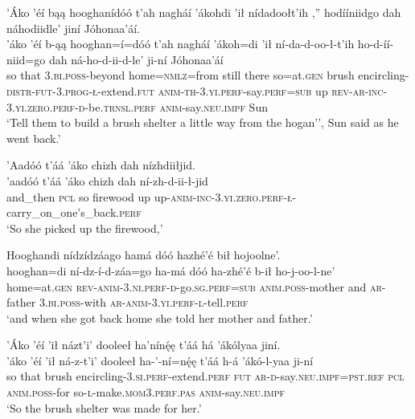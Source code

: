 \ea\label{ex:text5-7-12}
’Áko ’éí bąą hooghanídóó t’ah nagháí ’ákohdi ’ił nídadoołt’ih ,'' hodííniidgo dah náhodiidle’ jiní Jóhonaa’áí.\\
\gll ’áko	’éí	b-ąą	hooghan=í=dóó	t’ah	nagháí	’ákoh=di	’ił	ní-da-d-oo-ł-t’ih	ho-d-íí-niid=go	dah	ná-ho-d-ii-d-le’	ji-ní	Jóhonaa’áí\\
     so	that	3.\textsc{bi}.\textsc{poss}-beyond	home=\textsc{nmlz}=from	still	there	so=at.\textsc{gen}	brush	encircling-\textsc{distr}-\textsc{fut}-3.\textsc{prog}-\textsc{ł}-extend.\textsc{fut}	\textsc{anim}-\textsc{th}-3.\textsc{yi}.\textsc{perf}-say.\textsc{perf}=\textsc{sub}	up	\textsc{rev}-\textsc{ar}-\textsc{inc}-3.\textsc{yi}.\textsc{zero}.\textsc{perf}-\textsc{d}-be.\textsc{trnsl}.\textsc{perf}	\textsc{anim}-say.\textsc{neu}.\textsc{impf}	Sun\\
\glt `Tell them to build a brush shelter a little way from the hogan'', Sun said as he went back.'
\z

\ea\label{ex:text5-8-1}
’Aadóó t’áá ’áko chizh dah nízhdiiłjid.\\
\gll ’aadóó	t’áá	’áko	chizh	dah	ní-zh-d-ii-ł-jid\\
     and\_then	\textsc{pcl}	so	firewood	up	up-\textsc{anim}-\textsc{inc}-3.\textsc{yi}.\textsc{zero}.\textsc{perf}-\textsc{ł}-carry\_on\_one's\_back.\textsc{perf}\\
\glt `So she picked up the firewood,'
\z

\newpage
\ea\label{ex:text5-8-2}
Hooghandi nídzídzáago hamá dóó hazhé’é bił hojoolne’.\\
\gll hooghan=di	ní-dz-í-d-záa=go	ha-má	dóó	ha-zhé’é	b-ił	ho-j-oo-l-ne’\\
     home=at.\textsc{gen}	\textsc{rev}-\textsc{anim}-3.\textsc{ni}.\textsc{perf}-\textsc{d}-go.\textsc{sg}.\textsc{perf}=\textsc{sub}	\textsc{anim}.\textsc{poss}-mother	and	\textsc{ar}-father	3.\textsc{bi}.\textsc{poss}-with	\textsc{ar}-\textsc{anim}-3.\textsc{yi}.\textsc{perf}-\textsc{l}-tell.\textsc{perf}\\
\glt `and when she got back home she told her mother and father.'
\z

\ea\label{ex:text5-8-3}
’Áko ’éí ’ił názt’i’ dooleeł ha’nínę́ę t’áá há ’ákólyaa jiní.\\
\gll ’áko	’éí	’ił	ná-z-t’i’	dooleeł	ha-’-ní=nę́ę	t’áá	h-á	’ákó-l-yaa	ji-ní\\
     so	that	brush	encircling-3.\textsc{si}.\textsc{perf}-extend.\textsc{perf}	\textsc{fut}	\textsc{ar}-\textsc{d}-say.\textsc{neu}.\textsc{impf}=\textsc{pst}.\textsc{ref}	\textsc{pcl}	\textsc{anim}.\textsc{poss}-for	so-\textsc{l}-make.\textsc{mom}3.\textsc{perf}.\textsc{pas}	\textsc{anim}-say.\textsc{neu}.\textsc{impf}\\
\glt `So the brush shelter was made for her.'
\z

